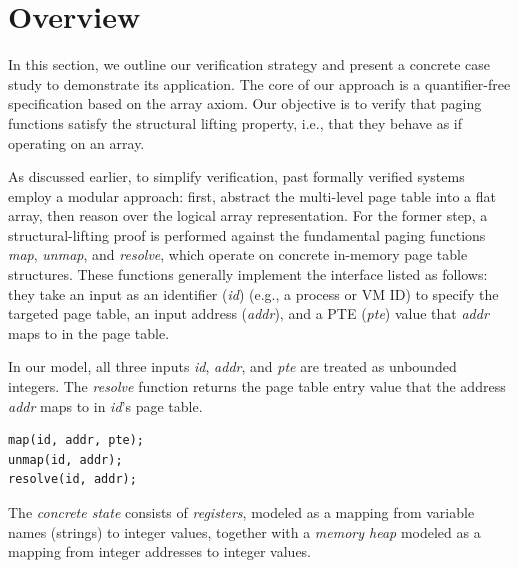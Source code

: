 \section{Overview}
\label{sec:overview}

In this section, we outline our verification strategy and present a concrete case study to demonstrate its application. 
The core of our approach is a quantifier-free specification based on the array axiom. Our objective is to verify that paging functions satisfy the structural lifting property, i.e., that they behave as if operating on an array.

As discussed earlier, to simplify verification, past formally verified systems employ a modular approach: first, abstract the multi-level page table into a flat array, then reason over the logical array representation. For the former step, a structural-lifting proof is performed against the fundamental paging functions \textit{map}, \textit{unmap}, and \textit{resolve}, which operate on concrete in-memory page table structures. These functions generally implement the interface listed as follows: they take an input as an identifier (\textit{id}) (e.g., a process or VM ID) to specify the targeted page table, an input address (\textit{addr}), and a PTE (\textit{pte}) value that \textit{addr} maps to in the page table.

In our model, all three inputs \textit{id}, \textit{addr}, and \textit{pte} are treated as unbounded integers. The \textit{resolve} function returns the page table entry value that the address \textit{addr} maps to in \textit{id}'s page table.


\begin{center}
\begin{minipage}{0.19\textwidth}
\begin{lstlisting}[style=customc]
map(id, addr, pte);
unmap(id, addr);
resolve(id, addr);
\end{lstlisting}
\end{minipage}
\end{center}

The \emph{concrete state} consists of \emph{registers}, modeled as a mapping from variable names (strings) to integer values, together with a \emph{memory heap} modeled as a mapping from integer addresses to integer values.

